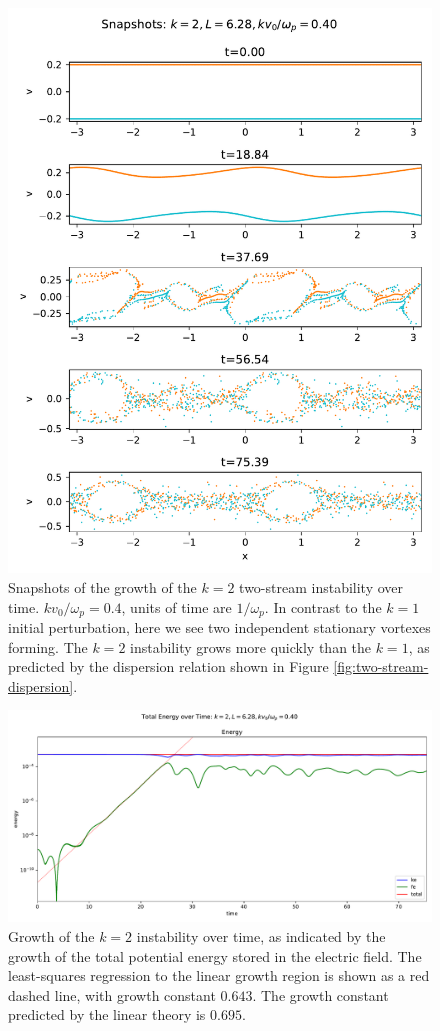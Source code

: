 \documentclass[%
 reprint,
 amsmath,amssymb,
 aps,
]{revtex4-2}
\begin{document}
\begin{figure}
\includegraphics[width=0.9\linewidth]{proj3/two-stream-k=2-snapshots.pdf}
\caption{\label{fig:two-stream-k=2-snapshots}Snapshots of the growth of the $k=2$ two-stream instability over time. $k v_0 / \omega_p = 0.4$, units of time are $1/\omega_p$. In contrast to the $k=1$ initial perturbation, here we see two independent stationary vortexes forming. The $k=2$ instability grows more quickly than the $k=1$, as predicted by the dispersion relation shown in Figure \ref{fig:two-stream-dispersion}.}
\end{figure}

\begin{figure}
\includegraphics[width=0.9\linewidth]{proj3/energy-k=2-two-stream.pdf}
\caption{\label{fig:two-stream-k=2-energy}Growth of the $k=2$ instability over time, as indicated by the growth of the total potential energy stored in the electric field. The least-squares regression to the linear growth region is shown as a red dashed line, with growth constant $0.643$. The growth constant predicted by the linear theory is $0.695$.}
\end{figure}
\end{document}
